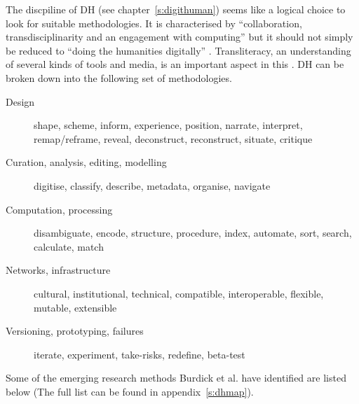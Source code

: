 The discpiline of \acf{DH} (see chapter~\ref{s:digithuman}) seems like a logical choice to look for suitable methodologies. It is characterised by ``collaboration, transdisciplinarity and an engagement with computing'' \autocite{Burdick2012} but it should not simply be reduced to ``doing the humanities digitally'' \autocite*{Burdick2012}. Transliteracy, an understanding of several kinds of tools and media, is an important aspect in this \autocite{Thomas2007}. \ac{DH} can be broken down into the following set of methodologies.

\begin{description}
  \item [Design] shape, scheme, inform, experience, position, narrate,
  					interpret, remap/reframe, reveal, deconstruct, reconstruct,
  					situate, critique
  \item [Curation, analysis, editing, modelling] digitise, classify, describe, metadata, organise, navigate
  \item [Computation, processing] disambiguate, encode, structure, procedure, index, automate, sort, search, calculate, match
  \item [Networks, infrastructure] cultural, institutional, technical, compatible, interoperable, flexible, mutable, extensible
  \item [Versioning, prototyping, failures]	iterate, experiment, take-risks, redefine, beta-test
\end{description}

Some of the emerging research methods Burdick et al. have identified are listed below \autocite*{Burdick2012} (The full list can be found in appendix~\ref{s:dhmap}).


